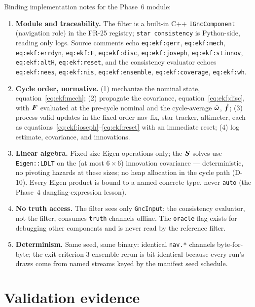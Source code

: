 Binding implementation notes for the Phase~6 module:
\begin{enumerate}
  \item \textbf{Module and traceability.} The filter is a built-in
    C++ \texttt{IGncComponent} (navigation role) in the FR-25
    registry; \texttt{star consistency} is Python-side, reading only
    logs. Source comments echo \texttt{eq:ekf:qerr},
    \texttt{eq:ekf:mech}, \texttt{eq:ekf:errdyn}, \texttt{eq:ekf:F},
    \texttt{eq:ekf:disc}, \texttt{eq:ekf:joseph},
    \texttt{eq:ekf:stinnov}, \texttt{eq:ekf:altH},
    \texttt{eq:ekf:reset}, and the consistency evaluator echoes
    \texttt{eq:ekf:nees}, \texttt{eq:ekf:nis},
    \texttt{eq:ekf:ensemble}, \texttt{eq:ekf:coverage},
    \texttt{eq:ekf:wh}.
  \item \textbf{Cycle order, normative.} (1) mechanize the nominal
    state, equation~\eqref{eq:ekf:mech}; (2) propagate the covariance,
    equation~\eqref{eq:ekf:disc}, with $\bm{F}$ evaluated at the
    pre-cycle nominal and the cycle-average $\hat{\bm{\omega}}$,
    $\hat{\bm{f}}$; (3) process valid updates in the fixed order nav
    fix, star tracker, altimeter, each as
    equations~\eqref{eq:ekf:joseph}--\eqref{eq:ekf:reset} with an
    immediate reset; (4) log estimate, covariance, and innovations.
  \item \textbf{Linear algebra.} Fixed-size Eigen operations only; the
    $\bm{S}$ solves use \texttt{Eigen::LDLT} on the (at most
    $6 \times 6$) innovation covariance --- deterministic, no pivoting
    hazards at these sizes; no heap allocation in the cycle path
    (D-10). Every Eigen product is bound to a named concrete type,
    never \texttt{auto} (the Phase~4 dangling-expression lesson).
  \item \textbf{No truth access.} The filter sees only
    \texttt{GncInput}; the consistency evaluator, not the filter,
    consumes \texttt{truth} channels offline. The \texttt{oracle}
    flag exists for debugging other components and is never read by
    the reference filter.
  \item \textbf{Determinism.} Same seed, same binary: identical
    \texttt{nav.*} channels byte-for-byte; the exit-criterion-3
    ensemble rerun is bit-identical because every run's draws come
    from named streams keyed by the manifest seed schedule.
\end{enumerate}

\section{Validation evidence}
\label{sec:ekf:validation}

